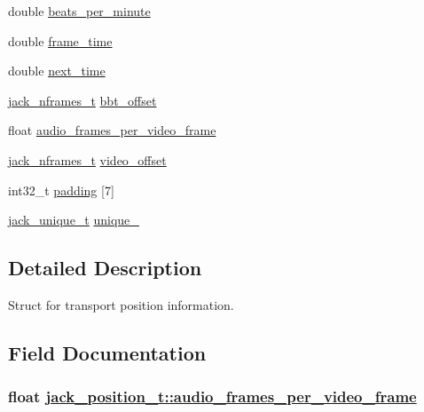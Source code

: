 \begin{CompactItemize}
\item 
double \hyperlink{structjack__position__t_348d88736ba362cf12317ec1f8af00ea}{beats\_\-per\_\-minute}
\item 
double \hyperlink{structjack__position__t_683f56a64ae2e6252300b510a6781423}{frame\_\-time}
\item 
double \hyperlink{structjack__position__t_5cf2de1a44101fdf59c134587f56520d}{next\_\-time}
\item 
\hyperlink{types_8h_fe9972a13782c1e282747fdb4bc46f9c}{jack\_\-nframes\_\-t} \hyperlink{structjack__position__t_8c66921efbae8beda14f18a6d3c7f13d}{bbt\_\-offset}
\item 
float \hyperlink{structjack__position__t_8a4d89aeb03ef8d47f65c19f577d84d9}{audio\_\-frames\_\-per\_\-video\_\-frame}
\item 
\hyperlink{types_8h_fe9972a13782c1e282747fdb4bc46f9c}{jack\_\-nframes\_\-t} \hyperlink{structjack__position__t_c512bcb7a53efd8cb8fe7874ff9a8a81}{video\_\-offset}
\item 
int32\_\-t \hyperlink{structjack__position__t_f81dd503d4fca757b4140cdf57b530dc}{padding} \mbox{[}7\mbox{]}
\item 
\hyperlink{transport_8h_35b13d418f3a4f572b3ea5849b6282f7}{jack\_\-unique\_\-t} \hyperlink{structjack__position__t_bcfabeff4d1c57da319ddd4ee12b7071}{unique\_}
\end{CompactItemize}


\subsection{Detailed Description}
Struct for transport position information. 



\subsection{Field Documentation}
\hypertarget{structjack__position__t_8a4d89aeb03ef8d47f65c19f577d84d9}{
\subsubsection[audio\_\-frames\_\-per\_\-video\_\-frame]{\setlength{\rightskip}{0pt plus 5cm}float \hyperlink{structjack__position__t_8a4d89aeb03ef8d47f65c19f577d84d9}{jack\_\-position\_\-t::audio\_\-frames\_\-per\_\-video\_\-frame}}}
\label{structjack__position__t_8a4d89aeb03ef8d47f65c19f577d84d9}


